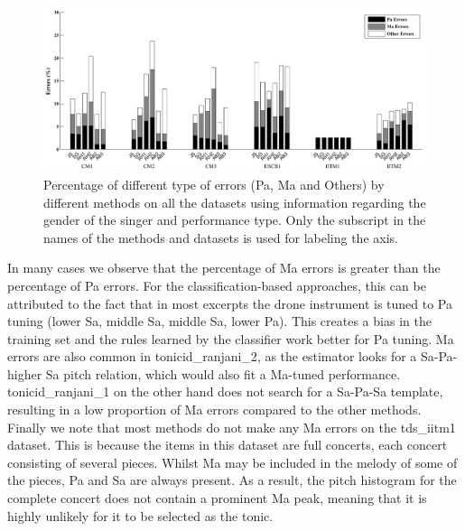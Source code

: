{\begin{figure}
	\begin{center}
		\includegraphics[width=\figSizeHundred]{ch05_preprocessing/figures/ErrorAnalysis_With_MF.pdf}
	\end{center}
	\caption[Percentage of Pa, Ma and `Other' type errors in tonic identification, using editorial metadata]{Percentage of different type of errors (Pa, Ma and Others) by different methods on all the datasets using information regarding the gender of the singer and performance type. Only the subscript in the names of the methods and datasets is used for labeling the axis.}
	\label{fig:tonic_identification_errors_with_MF}
\end{figure}

In many cases we observe that the percentage of Ma errors is greater than the percentage of Pa errors. For the classification-based approaches, this can be
attributed to the fact that in most excerpts the drone instrument is tuned to Pa tuning (lower Sa, middle Sa, middle Sa, lower Pa). This creates a
bias in the training set and the rules learned by the classifier work better for Pa tuning. Ma errors are also common in \acrshort{tonicid_ranjani_2}, as the estimator looks for a Sa-Pa-higher Sa pitch relation, which would also fit a Ma-tuned performance. \acrshort{tonicid_ranjani_1} on the other hand does not search for a Sa-Pa-Sa template, resulting in a low proportion of Ma errors compared to the other methods. Finally we note that most methods do not make any Ma errors on the \acrshort{tds_iitm1} dataset. This is because the items in this dataset are full concerts, each concert consisting of several pieces. Whilst Ma may be included in the melody of some of the pieces, Pa and Sa are always present. As a result, the pitch histogram for the complete concert does not contain a prominent Ma peak, meaning that it is highly unlikely for it to be selected as the tonic.



}
